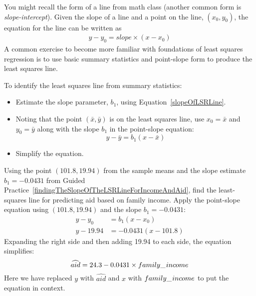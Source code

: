 You might recall the  form of a line from math class (another common form is \emph{slope-intercept}). Given the slope of a line and a point on the line, $(x_0, y_0)$, the equation for the line can be written as
\begin{eqnarray}
y - y_0 = slope\times (x - x_0)
\label{pointSlopeFormForALine}
\end{eqnarray}
A common exercise to become more familiar with foundations of least squares regression is to use basic summary statistics and point-slope form to produce the least squares line. 

\begin{tipBox}{
To identify the least squares line from summary statistics:\vspace{-1mm}
\begin{itemize}
\setlength{\itemsep}{0mm}
\item Estimate the slope parameter, $b_1$, using Equation~\eqref{slopeOfLSRLine}.
\item Noting that the point $(\bar{x}, \bar{y})$ is on the least squares line, use $x_0=\bar{x}$ and $y_0=\bar{y}$ along with the slope $b_1$ in the point-slope equation:
$$y - \bar{y} = b_1 (x - \bar{x}) $$
\item Simplify the equation.\vspace{0.5mm}
\end{itemize}}
\end{tipBox}

\begin{example}{Using the point $(101.8, 19.94)$ from the sample means and the slope estimate $b_1 = -0.0431$ from Guided Practice~\ref{findingTheSlopeOfTheLSRLineForIncomeAndAid}, find the least-squares line for predicting aid based on family income.} \label{exampleToFindLSRLineOfElmhurstData}
Apply the point-slope equation using $(101.8, 19.94)$ and the slope $b_1 = -0.0431$:
\begin{align*}
y - y_0     &= b_1 (x - x_0) \\
y - 19.94  &= -0.0431(x - 101.8)
\end{align*}
Expanding the right side and then adding 19.94 to each side, the equation simplifies:
$$ \widehat{aid} = 24.3 - 0.0431 \times family\_\hspace{0.3mm}income $$
Here we have replaced $y$ with $\widehat{aid}$ and $x$ with $family\_\hspace{0.3mm}income$ to put the equation in context.
\end{example}

